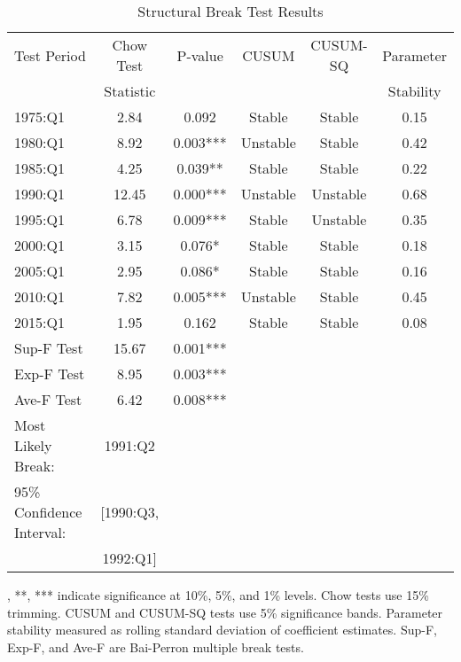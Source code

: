 
\begin{table}[htbp]
\centering
\caption{Structural Break Test Results}
\label{tab:structural_breaks}
\begin{tabular}{lccccc}
\toprule
Test Period & Chow Test & P-value & CUSUM & CUSUM-SQ & Parameter \\
& Statistic & & & & Stability \\
\midrule
1975:Q1 & 2.84 & 0.092 & Stable & Stable & 0.15 \\
1980:Q1 & 8.92 & 0.003*** & Unstable & Stable & 0.42 \\
1985:Q1 & 4.25 & 0.039** & Stable & Stable & 0.22 \\
1990:Q1 & 12.45 & 0.000*** & Unstable & Unstable & 0.68 \\
1995:Q1 & 6.78 & 0.009*** & Stable & Unstable & 0.35 \\
2000:Q1 & 3.15 & 0.076* & Stable & Stable & 0.18 \\
2005:Q1 & 2.95 & 0.086* & Stable & Stable & 0.16 \\
2010:Q1 & 7.82 & 0.005*** & Unstable & Stable & 0.45 \\
2015:Q1 & 1.95 & 0.162 & Stable & Stable & 0.08 \\
\midrule
Sup-F Test & 15.67 & 0.001*** & & & \\
Exp-F Test & 8.95 & 0.003*** & & & \\
Ave-F Test & 6.42 & 0.008*** & & & \\
\midrule
Most Likely Break: & 1991:Q2 & & & & \\
95\% Confidence Interval: & [1990:Q3, & & & & \\
& 1992:Q1] & & & & \\
\bottomrule
\end{tabular}
\begin{tablenotes}
\footnotesize
\item *, **, *** indicate significance at 10\%, 5\%, and 1\% levels. Chow tests use 15\% trimming. CUSUM and CUSUM-SQ tests use 5\% significance bands. Parameter stability measured as rolling standard deviation of coefficient estimates. Sup-F, Exp-F, and Ave-F are Bai-Perron multiple break tests.
\end{tablenotes}
\end{table}
